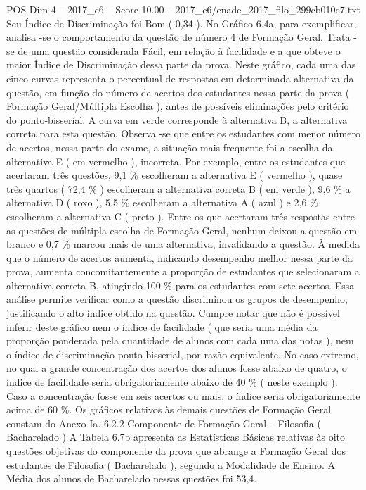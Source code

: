 \begin{textsample}{POS Dim 4 – 2017\_c6 – Score 10.00 – 2017\_c6/enade\_2017\_filo\_299cb010c7.txt}
Seu Índice de Discriminação foi Bom ( 0,34 ).
No Gráfico 6.4a, para exemplificar, analisa -se o comportamento da questão de número 4 de Formação Geral.
Trata -se de uma questão considerada Fácil, em relação à facilidade e a que obteve o maior Índice de Discriminação dessa parte da prova.
Neste gráfico, cada uma das cinco curvas representa o percentual de respostas em determinada alternativa da questão, em função do número de acertos dos estudantes nessa parte da prova ( Formação Geral/Múltipla Escolha ), antes de possíveis eliminações pelo critério do ponto-bisserial.
A curva em verde corresponde à alternativa B, a alternativa correta para esta questão.
Observa -se que entre os estudantes com menor número de acertos, nessa parte do exame, a situação mais frequente foi a escolha da alternativa E ( em vermelho ), incorreta.
Por exemplo, entre os estudantes que acertaram três questões, 9,1 \% escolheram a alternativa E ( vermelho ), quase três quartos ( 72,4 \% ) escolheram a alternativa correta B ( em verde ), 9,6 \% a alternativa D ( roxo ), 5,5 \% escolheram a alternativa A ( azul ) e 2,6 \% escolheram a alternativa C ( preto ).
Entre os que acertaram três respostas entre as questões de múltipla escolha de Formação Geral, nenhum deixou a questão em branco e 0,7 \% marcou mais de uma alternativa, invalidando a questão.
À medida que o número de acertos aumenta, indicando desempenho melhor nessa parte da prova, aumenta concomitantemente a proporção de estudantes que selecionaram a alternativa correta B, atingindo 100 \% para os estudantes com sete acertos.
Essa análise permite verificar como a questão discriminou os grupos de desempenho, justificando o alto índice obtido na questão.
Cumpre notar que não é possível inferir deste gráfico nem o índice de facilidade ( que seria uma média da proporção ponderada pela quantidade de alunos com cada uma das notas ), nem o índice de discriminação ponto-bisserial, por razão equivalente.
No caso extremo, no qual a grande concentração dos acertos dos alunos fosse abaixo de quatro, o índice de facilidade seria obrigatoriamente abaixo de 40 \% ( neste exemplo ).
Caso a concentração fosse em seis acertos ou mais, o índice seria obrigatoriamente acima de 60 \%.
Os gráficos relativos às demais questões de Formação Geral constam do Anexo Ia. 6.2.2 Componente de Formação Geral – Filosofia ( Bacharelado ) A Tabela 6.7b apresenta as Estatísticas Básicas relativas às oito questões objetivas do componente da prova que abrange a Formação Geral dos estudantes de Filosofia ( Bacharelado ), segundo a Modalidade de Ensino.
A Média dos alunos de Bacharelado nessas questões foi 53,4.

\end{textsample}
